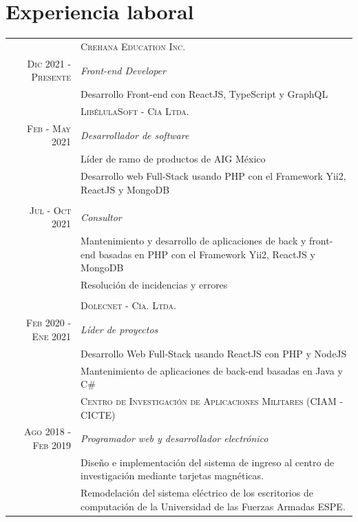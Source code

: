 \documentclass[a4paper,10.9pt]{article}
\begin{document}
\section{Experiencia laboral}
\begin{tabular}{r|p{11cm}}
&\textsc{Crehana Education Inc.} \\
\textsc{Dic 2021 - Presente}&\emph{Front-end Developer}\\
&\footnotesize{Desarrollo Front-end con ReactJS, TypeScript y GraphQL}
\multicolumn{2}{c}{} \\ 
&\textsc{LibélulaSoft - Cía Ltda.} \\
\textsc{Feb - May 2021} &\emph{Desarrollador de software}\\
&\footnotesize{Líder de ramo de productos de AIG México}\\
&\footnotesize{Desarrollo web Full-Stack usando PHP con el Framework Yii2, ReactJS y MongoDB}\\
\\
\textsc{Jul - Oct 2021} &\emph{Consultor}\\
&\footnotesize{Mantenimiento y desarrollo de aplicaciones de back y front-end basadas en PHP con el Framework Yii2, ReactJS y MongoDB}\\
&\footnotesize{Resolución de incidencias y errores}\\
\multicolumn{2}{c}{} \\ 
&\textsc{Dolecnet - Cía. Ltda.}\\
\textsc{Feb 2020 - Ene 2021} &\emph{Líder de proyectos}\\
&\footnotesize{Desarrollo Web Full-Stack usando ReactJS con PHP y NodeJS}\\
&\footnotesize{Mantenimiento de aplicaciones de back-end basadas en Java y C\#}
\multicolumn{2}{c}{} \\ 
&\textsc{Centro de Investigación de Aplicaciones Militares (CIAM - CICTE)}\\
\textsc{Ago 2018 - Feb 2019}&\emph{Programador web y desarrollador electrónico}\\
&\footnotesize{Diseño e implementación del sistema de ingreso al centro de investigación mediante tarjetas magnéticas.}\\
&\footnotesize{Remodelación del sistema eléctrico de los escritorios de computación de la Universidad de las Fuerzas Armadas ESPE.}\\  
\end{tabular}
\end{document}
